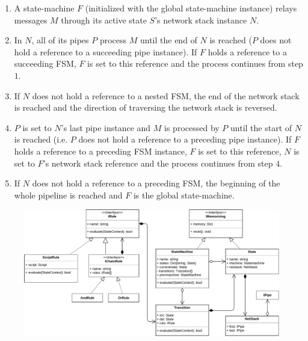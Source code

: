 \begin{enumerate}
    \item A state-machine $F$ (initialized with the global state-machine instance) relays messages $M$ through its active state $S$'s network stack instance $N$.
    \item In $N$, all of its pipes $P$ process $M$ until the end of $N$ is reached ($P$ does not hold a reference to a succeeding pipe instance). If $F$ holds a reference to a succeeding \ac{FSM}, $F$ is set to this reference and the process continues from step $1$.
    \item If $N$ does not hold a reference to a nested \ac{FSM}, the end of the network stack is reached and the direction of traversing the network stack is reversed.
    \item $P$ is set to $N$'s last pipe instance and $M$ is processed by $P$ until the start of $N$ is reached (i.e. $P$ does not hold a reference to a preceding pipe instance). If $F$ holds a reference to a preceding \ac{FSM} instance, $F$ is set to this reference, $N$ is set to $F$'s network stack reference and the process continues from step $4$.
    \item If $N$ does not hold a reference to a preceding \ac{FSM}, the beginning of the whole pipeline is reached and $F$ is the global state-machine.
\end{enumerate}

\begin{figure}[h]
    \centering
    \includegraphics[width=14cm]{img/ch05/classes-1-fsm-rules-netstack.pdf}
    \label{fig:classes-1-fsm-rules-netstack}
\end{figure}
